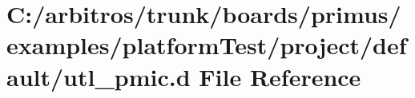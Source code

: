 \hypertarget{boards_2primus_2examples_2platform_test_2project_2default_2utl__pmic_8d}{\section{C\-:/arbitros/trunk/boards/primus/examples/platform\-Test/project/default/utl\-\_\-pmic.d File Reference}
\label{boards_2primus_2examples_2platform_test_2project_2default_2utl__pmic_8d}
}

